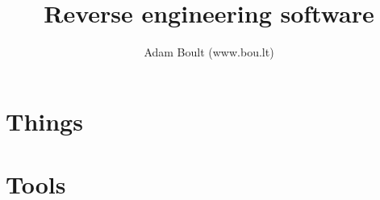 \documentclass[oneside]{book}
\begin{document}
\author{Adam Boult (www.bou.lt)}
\title{Reverse engineering software}
\maketitle

\setcounter{tocdepth}{0}
\tableofcontents



\part{Things}


\part{Tools}

\end{document}
